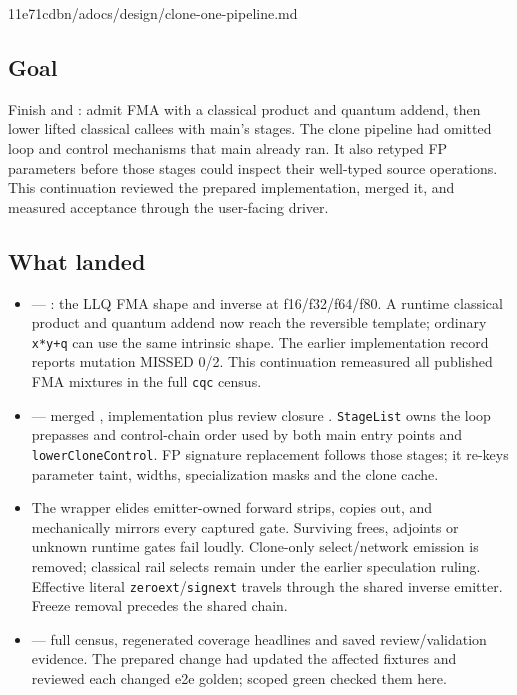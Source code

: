 %
  {11e71cdb}{n/a}{docs/design/clone-one-pipeline.md}

\subsection*{Goal}
Finish  and : admit FMA with a classical product and
quantum addend, then lower lifted classical callees with main's stages. The clone
pipeline had omitted loop and control mechanisms that main already ran. It also
retyped FP parameters before those stages could inspect their well-typed source
operations. This continuation reviewed the prepared implementation, merged it,
and measured acceptance through the user-facing driver.

\subsection*{What landed}
\begin{itemize}
  \item {} --- : the LLQ FMA shape and inverse at
  f16/f32/f64/f80. A runtime classical product and quantum addend now reach the
  reversible template; ordinary \texttt{x*y+q} can use the same intrinsic shape.
  The earlier implementation record reports mutation MISSED 0/2. This continuation
  remeasured all published FMA mixtures in the full \texttt{cqc} census.
  \item {} --- merged , implementation
   plus review closure . \texttt{StageList}
  owns the loop prepasses and control-chain order used by both main entry points
  and \texttt{lowerCloneControl}. FP signature replacement follows those stages;
  it re-keys parameter taint, widths, specialization masks and the clone cache.
  \item The wrapper elides emitter-owned forward strips, copies out, and
  mechanically mirrors every captured gate. Surviving frees, adjoints or unknown
  runtime gates fail loudly. Clone-only select/network emission is removed;
  classical rail selects remain under the earlier speculation ruling. Effective
  literal \texttt{zeroext}/\texttt{signext} travels through the shared inverse
  emitter. Freeze removal precedes the shared chain.
  \item {} --- full census, regenerated coverage headlines and
  saved review/validation evidence. The prepared change had updated the affected
  fixtures and reviewed each changed e2e golden; scoped green checked them here.
\end{itemize}

